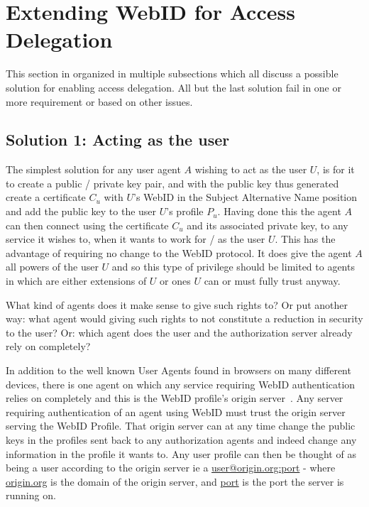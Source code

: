 \documentclass[a4paper]{llncs}
\begin{document}

\section{Extending WebID for Access Delegation}\label{sec:spec}

This section in organized in multiple subsections which all discuss a possible solution for enabling access delegation.
All but the last solution fail in one or more requirement or based on other issues.

\subsection{Solution 1: Acting as the user}

The simplest solution for any user agent $A$ wishing to act as the user $U$, is for it to create a public / private key pair,  and with the public key thus generated create a certificate $C_u$ with $U$'s WebID in the Subject Alternative Name position and add the public key to the user $U$'s profile $P_u$.
Having done this the agent $A$ can then connect using the certificate $C_u$ and its associated private key, to any service it wishes to, when it wants to work for / as the user $U$.
This has the advantage of requiring no change to the WebID protocol.
It does give the agent $A$ all powers of the user $U$ and so this type of privilege should be limited to agents in which are either extensions of $U$ or ones $U$ can or must fully trust anyway.




What kind of agents does it make sense to give such rights to?
Or put another way: what agent would giving such rights to not constitute a reduction in security to the user?
Or: which agent does the user and the authorization server already rely on completely?

In addition to the well known User Agents found in browsers on many different devices, there is one agent  on which any service requiring WebID authentication relies on completely and this is the WebID profile's origin server~\cite{barth-a-2011--a}.
Any server requiring authentication of an agent using WebID must trust the origin server serving the WebID Profile.
That origin server can at any time change the public keys in the profiles sent back to any authorization agents and indeed change any information in the profile it wants to.
Any user profile can then be thought of as being a user according to the origin server ie a \url{user@origin.org:port} - where \url{origin.org} is the domain of the origin server, and \url{port} is the port the server is running on.
\end{document}
